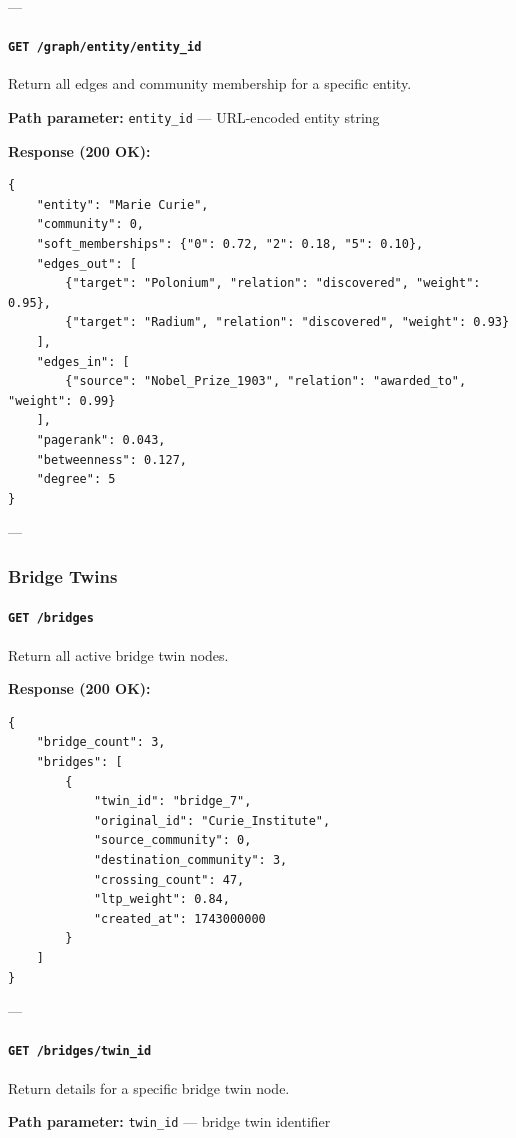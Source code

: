 \documentclass[11pt,article,oneside]{memoir}
\begin{document}
---

\paragraph{\texttt{GET /graph/entity/{entity\_id}}}
Return all edges and community membership for a specific entity.

\textbf{Path parameter:} \texttt{entity\_id} — URL-encoded entity string

\textbf{Response (200 OK):}
\begin{lstlisting}
{
    "entity": "Marie Curie",
    "community": 0,
    "soft_memberships": {"0": 0.72, "2": 0.18, "5": 0.10},
    "edges_out": [
        {"target": "Polonium", "relation": "discovered", "weight": 0.95},
        {"target": "Radium", "relation": "discovered", "weight": 0.93}
    ],
    "edges_in": [
        {"source": "Nobel_Prize_1903", "relation": "awarded_to", "weight": 0.99}
    ],
    "pagerank": 0.043,
    "betweenness": 0.127,
    "degree": 5
}
\end{lstlisting}

---

\subsubsection{Bridge Twins}

\paragraph{\texttt{GET /bridges}}
Return all active bridge twin nodes.

\textbf{Response (200 OK):}
\begin{lstlisting}
{
    "bridge_count": 3,
    "bridges": [
        {
            "twin_id": "bridge_7",
            "original_id": "Curie_Institute",
            "source_community": 0,
            "destination_community": 3,
            "crossing_count": 47,
            "ltp_weight": 0.84,
            "created_at": 1743000000
        }
    ]
}
\end{lstlisting}

---

\paragraph{\texttt{GET /bridges/{twin\_id}}}
Return details for a specific bridge twin node.

\textbf{Path parameter:} \texttt{twin\_id} — bridge twin identifier
\end{document}
